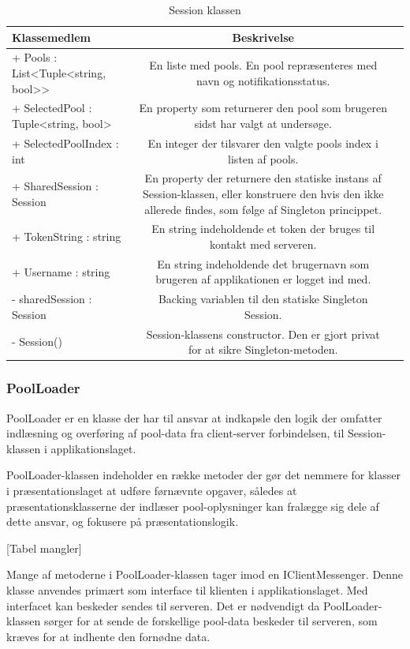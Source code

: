 \begin{table}
	\centering
	\begin{tabular}{lcr}
		\toprule
		\textbf{Klassemedlem}	& \textbf{Beskrivelse} \\
		\midrule
		+ Pools : List<Tuple<string, bool>>			& En liste med pools. En pool repræsenteres med navn og notifikationsstatus.		\\
		+ SelectedPool : Tuple<string, bool>			& En property som returnerer den pool som brugeren sidst har valgt at undersøge.	\\
		+ SelectedPoolIndex : int					& En integer der tilsvarer den valgte pools index i listen af pools.				\\
		+ SharedSession : Session				& En property der returnere den statiske instans af Session-klassen, eller konstruere den hvis den ikke allerede findes, som følge af Singleton princippet. \\
		+ TokenString : string					& En string indeholdende et token der bruges til kontakt med serveren. \\
		+ Username : string						& En string indeholdende det brugernavn som brugeren af applikationen er logget ind med. \\
		- sharedSession : Session					& Backing variablen til den statiske Singleton Session. \\
		- Session()							& Session-klassens constructor. Den er gjort privat for at sikre Singleton-metoden. \\
		\bottomrule
		\end{tabular}
	\caption{Session klassen}
	\label{tab:table_design_session}	
\end{table}

\subsubsection{PoolLoader}
PoolLoader er en klasse der har til ansvar at indkapsle den logik der omfatter indlæsning og overføring af pool-data fra client-server forbindelsen, til Session-klassen i applikationslaget. 

PoolLoader-klassen indeholder en række metoder der gør det nemmere for klasser i præsentationslaget at udføre førnævnte opgaver, således at præsentationsklasserne der indlæser pool-oplysninger kan fralægge sig dele af dette ansvar, og fokusere på præsentationslogik.

[Tabel mangler]

Mange af metoderne i PoolLoader-klassen tager imod en IClientMessenger. Denne klasse anvendes primært som interface til klienten i applikationslaget. Med interfacet kan beskeder sendes til serveren. Det er nødvendigt da PoolLoader-klassen sørger for at sende de forskellige pool-data beskeder til serveren, som kræves for at indhente den fornødne data.

